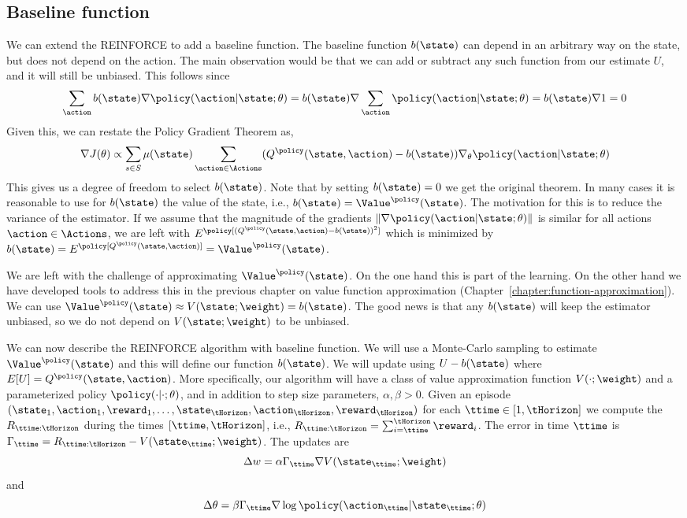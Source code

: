 \subsection*{Baseline function}
We can extend the REINFORCE to add a baseline function.
The baseline function $b(\state)$ can depend in an arbitrary way on
the state, but does not depend on the action. The main observation
would be that we can add or subtract any such function from our
estimate $U$, and it will still be unbiased. This follows since
\[
\sum_\action b(\state) \nabla
\policy(\action|\state;\theta)=b(\state)\nabla \sum_\action
\policy(\action|\state;\theta)=b(\state)\nabla 1=0
\]
Given this, we can restate the Policy Gradient Theorem as,
\[
\nabla J(\theta)\propto \sum_{s\in S} \mu(\state) \sum_{\action\in
\Actions} (Q^\policy (\state,\action)-b(\state))\nabla_\theta
\policy(\action|\state;\theta)
\]
This gives us a degree of freedom to select $b(\state)$. Note that
by setting $b(\state)=0$ we get the original theorem. In many cases
it is reasonable to use for $b(\state)$ the value of the state,
i.e., $b(\state)=\Value^\policy(\state)$. The motivation for this is
to reduce the variance of the estimator. If we assume that the
magnitude of the gradients $\|\nabla
\policy(\action|\state;\theta)\|$ is similar for all actions
$\action\in \Actions$, we are left with $E^\policy
[(Q^\policy(\state,\action)-b(\state))^2]$ which is minimized by
$b(\state)=E^\policy[Q^\policy(\state,\action)]=\Value^\policy(\state)$.

We are left with the challenge of approximating
$\Value^\policy(\state)$. On the one hand this is part of the
learning. On the other hand we have developed tools to address this
in the previous chapter on value function approximation (Chapter~\ref{chapter:function-approximation}). We can use
$\Value^\policy(\state)\approx V(\state;\weight)=b(\state)$. The
good news is that any $b(\state)$ will keep the estimator unbiased,
so we do not depend on $V(\state;\weight)$ to be unbiased.

We can now describe the REINFORCE algorithm with baseline function.
We will use a Monte-Carlo sampling to estimate
$\Value^\policy(\state)$ and this will define our function
$b(\state)$. We will update using $U-b(\state)$ where
$E[U]=Q^\policy(\state,\action)$. More specifically, our algorithm
will have a class of value approximation function $V(\cdot;\weight)$
and a parameterized policy $\policy(\cdot|\cdot;\theta)$, and in
addition to step size parameters, $\alpha,\beta>0$. Given an episode
$(\state_1,\action_1,\reward_1,
\ldots,\state_\tHorizon,\action_\tHorizon,\reward_\tHorizon)$ for each $\ttime\in [1,\tHorizon]$ we
compute the $R_{\ttime:\tHorizon}$ during the times $[\ttime,\tHorizon]$, i.e.,
$R_{\ttime:\tHorizon}=\sum_{i=\ttime}^\tHorizon \reward_i$. The error in time $\ttime$ is
$\Gamma_\ttime=R_{\ttime:\tHorizon}-V(\state_\ttime;\weight)$. The updates
are
\[
\Delta w=\alpha \Gamma_\ttime \nabla V(\state_\ttime;\weight)
\]
and
\[
\Delta \theta=\beta\Gamma_\ttime \nabla \log
\policy(\action_\ttime|\state_\ttime;\theta)
\]


